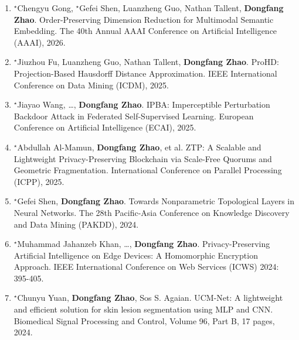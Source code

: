 \documentclass[11pt,]{scrartcl}
\begin{document}
\begin{enumerate}
  \leftskip-0.13in %

\item 	$^\star$Chengyu Gong, $^\star$Gefei Shen, Luanzheng Guo, Nathan Tallent, \textbf{Dongfang Zhao}.
Order-Preserving Dimension Reduction for Multimodal Semantic Embedding. 
The 40th Annual AAAI Conference on Artificial Intelligence (AAAI), 2026.

\item 	$^\star$Jiuzhou Fu, Luanzheng Guo, Nathan Tallent, \textbf{Dongfang Zhao}.
ProHD: Projection-Based Hausdorff Distance Approximation. 
IEEE International Conference on Data Mining (ICDM), 2025.

\item 	$^\star$Jiayao Wang, \dots, \textbf{Dongfang Zhao}.
IPBA: Imperceptible Perturbation Backdoor Attack in Federated Self-Supervised Learning. 
European Conference on Artificial Intelligence (ECAI), 2025.

\item 	$^\star$Abdullah Al-Mamun, \textbf{Dongfang Zhao}, et al.
ZTP: A Scalable and Lightweight Privacy-Preserving Blockchain via Scale-Free Quorums and Geometric Fragmentation. 
International Conference on Parallel Processing (ICPP), 2025.

\item 	$^\star$Gefei Shen, \textbf{Dongfang Zhao}.
Towards Nonparametric Topological Layers in Neural Networks. 
The 28th Pacific-Asia Conference on Knowledge Discovery and Data Mining (PAKDD), 2024.

\item $^\star$Muhammad Jahanzeb Khan, \dots, \textbf{Dongfang Zhao}.
Privacy-Preserving Artificial Intelligence on Edge Devices: A Homomorphic Encryption Approach. IEEE International Conference on Web Services (ICWS) 2024: 395-405.

\item $^\star$Chunyu Yuan, \textbf{Dongfang Zhao}, Sos S. Agaian.
UCM-Net: A lightweight and efficient solution for skin lesion segmentation using MLP and CNN.
Biomedical Signal Processing and Control, Volume 96, Part B, 17 pages, 2024.




\end{enumerate}
\end{document}
